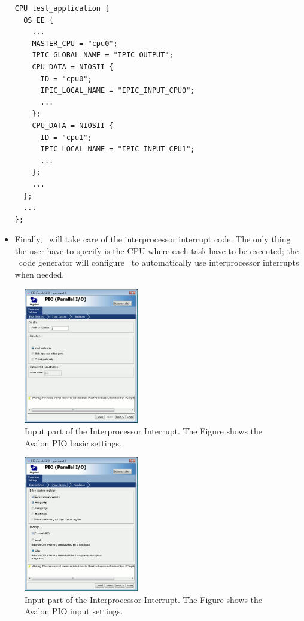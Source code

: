 \begin{itemize}
\begin{lstlisting}
CPU test_application {
  OS EE {
    ...
    MASTER_CPU = "cpu0";			
    IPIC_GLOBAL_NAME = "IPIC_OUTPUT";
    CPU_DATA = NIOSII {
      ID = "cpu0";
      IPIC_LOCAL_NAME = "IPIC_INPUT_CPU0";
      ...
    };
    CPU_DATA = NIOSII {
      ID = "cpu1";
      IPIC_LOCAL_NAME = "IPIC_INPUT_CPU1";
      ...
    };
    ...
  };
  ...
};
\end{lstlisting}



\item Finally, \ee\ will take care of the interprocessor interrupt
  code. The only thing the user have to specify is the CPU where each
  task have to be executed; the \rtd\ code generator will configure
  \ee\ to automatically use interprocessor interrupts when needed.
\end{itemize}

\begin{figure}
  \begin{center}
    \includegraphics[width=5cm, bb=0 0 518 614]{images/IPIC_PIO_in_dialogbox_basic.png}
  \end{center}
  \caption{Input part of the Interprocessor 
    Interrupt. The Figure shows the Avalon PIO basic settings.}
  \label{fig:IPIC-input-basic}
\end{figure}

\begin{figure}
  \begin{center}
    \includegraphics[width=5cm, bb=0 0 518 613]{images/IPIC_PIO_in_dialogbox_input.png}
  \end{center}
  \caption{Input part of the Interprocessor Interrupt. 
    The Figure shows the Avalon PIO input settings.}
  \label{fig:IPIC-input-input}
\end{figure}

